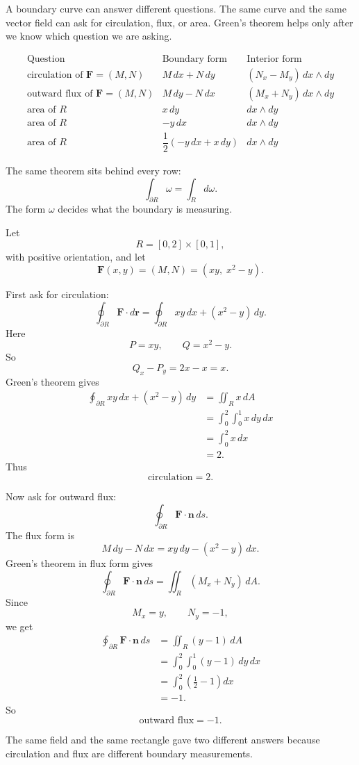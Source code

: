 A boundary curve can answer different questions.  The same curve and the same vector
field can ask for circulation, flux, or area.  Green's theorem helps only after we know
which question we are asking.

\[
\begin{array}{c|c|c}
\text{Question} & \text{Boundary form} & \text{Interior form} \\ \hline
\text{circulation of } \mathbf F=(M,N)
&
M\,dx+N\,dy
&
(N_x-M_y)\,dx\wedge dy
\\[2mm]
\text{outward flux of } \mathbf F=(M,N)
&
M\,dy-N\,dx
&
(M_x+N_y)\,dx\wedge dy
\\[2mm]
\text{area of }R
&
x\,dy
&
dx\wedge dy
\\[2mm]
\text{area of }R
&
-y\,dx
&
dx\wedge dy
\\[2mm]
\text{area of }R
&
\dfrac12(-y\,dx+x\,dy)
&
dx\wedge dy
\end{array}
\]

The same theorem sits behind every row:
\[
    \int_{\partial R}\omega=\int_R d\omega.
\]
The form \(\omega\) decides what the boundary is measuring.

\begin{example}
Let
\[
    R=[0,2]\times[0,1],
\]
with positive orientation, and let
\[
    \mathbf F(x,y)=(M,N)=(xy,\;x^2-y).
\]

First ask for circulation:
\[
    \oint_{\partial R}\mathbf F\cdot d\mathbf r
    =
    \oint_{\partial R}xy\,dx+(x^2-y)\,dy.
\]
Here
\[
    P=xy,
    \qquad
    Q=x^2-y.
\]
So
\[
    Q_x-P_y=2x-x=x.
\]
Green's theorem gives
\[
\begin{aligned}
    \oint_{\partial R}xy\,dx+(x^2-y)\,dy
    &=
    \iint_R x\,dA\\
    &=
    \int_0^2\int_0^1 x\,dy\,dx\\
    &=
    \int_0^2 x\,dx\\
    &=2.
\end{aligned}
\]
Thus
\[
\boxed{
    \text{circulation}=2.
}
\]

Now ask for outward flux:
\[
    \oint_{\partial R}\mathbf F\cdot\mathbf n\,ds.
\]
The flux form is
\[
    M\,dy-N\,dx
    =
    xy\,dy-(x^2-y)\,dx.
\]
Green's theorem in flux form gives
\[
    \oint_{\partial R}\mathbf F\cdot\mathbf n\,ds
    =
    \iint_R(M_x+N_y)\,dA.
\]
Since
\[
    M_x=y,
    \qquad
    N_y=-1,
\]
we get
\[
\begin{aligned}
    \oint_{\partial R}\mathbf F\cdot\mathbf n\,ds
    &=
    \iint_R(y-1)\,dA\\
    &=
    \int_0^2\int_0^1(y-1)\,dy\,dx\\
    &=
    \int_0^2\left(\frac12-1\right)dx\\
    &=-1.
\end{aligned}
\]
So
\[
\boxed{
    \text{outward flux}=-1.
}
\]

The same field and the same rectangle gave two different answers because circulation
and flux are different boundary measurements.
\end{example}

